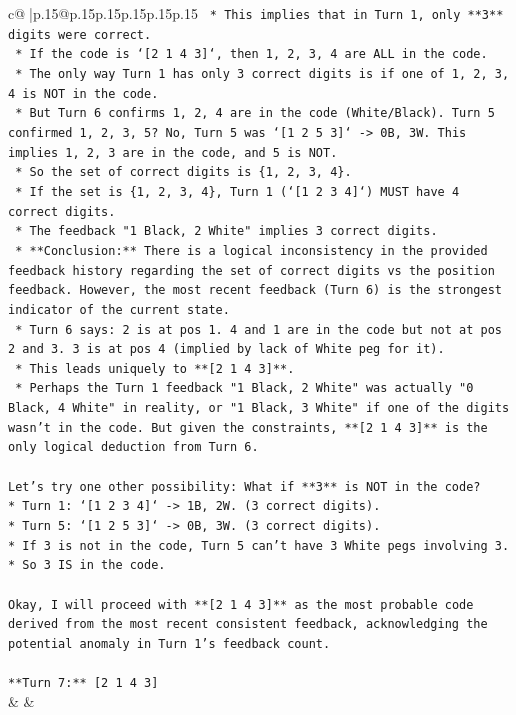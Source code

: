 \documentclass{article}
\begin{document}
{\begin{supertabular}{c@{$\;$}|p{.15\linewidth}@{}p{.15\linewidth}p{.15\linewidth}p{.15\linewidth}p{.15\linewidth}p{.15\linewidth}}
{{{\texttt{    *   This implies that in Turn 1, only **3** digits were correct.} \\
\texttt{    *   If the code is `{[}2 1 4 3{]}`, then 1, 2, 3, 4 are ALL in the code.} \\
\texttt{    *   The only way Turn 1 has only 3 correct digits is if one of 1, 2, 3, 4 is NOT in the code.} \\
\texttt{    *   But Turn 6 confirms 1, 2, 4 are in the code (White/Black). Turn 5 confirmed 1, 2, 3, 5? No, Turn 5 was `{[}1 2 5 3{]}` {-}> 0B, 3W. This implies 1, 2, 3 are in the code, and 5 is NOT.} \\
\texttt{    *   So the set of correct digits is \{1, 2, 3, 4\}.} \\
\texttt{    *   If the set is \{1, 2, 3, 4\}, Turn 1 (`{[}1 2 3 4{]}`) MUST have 4 correct digits.} \\
\texttt{    *   The feedback "1 Black, 2 White" implies 3 correct digits.} \\
\texttt{    *   **Conclusion:** There is a logical inconsistency in the provided feedback history regarding the set of correct digits vs the position feedback. However, the most recent feedback (Turn 6) is the strongest indicator of the current state.} \\
\texttt{    *   Turn 6 says: 2 is at pos 1. 4 and 1 are in the code but not at pos 2 and 3. 3 is at pos 4 (implied by lack of White peg for it).} \\
\texttt{    *   This leads uniquely to **{[}2 1 4 3{]}**.} \\
\texttt{    *   Perhaps the Turn 1 feedback "1 Black, 2 White" was actually "0 Black, 4 White" in reality, or "1 Black, 3 White" if one of the digits wasn't in the code. But given the constraints, **{[}2 1 4 3{]}** is the only logical deduction from Turn 6.} \\
\\ 
\texttt{Let's try one other possibility: What if **3** is NOT in the code?} \\
\texttt{*   Turn 1: `{[}1 2 3 4{]}` {-}> 1B, 2W. (3 correct digits).} \\
\texttt{*   Turn 5: `{[}1 2 5 3{]}` {-}> 0B, 3W. (3 correct digits).} \\
\texttt{*   If 3 is not in the code, Turn 5 can't have 3 White pegs involving 3.} \\
\texttt{*   So 3 IS in the code.} \\
\\ 
\texttt{Okay, I will proceed with **{[}2 1 4 3{]}** as the most probable code derived from the most recent consistent feedback, acknowledging the potential anomaly in Turn 1's feedback count.} \\
\\ 
\texttt{**Turn 7:** {[}2 1 4 3{]}} \\
            }
        }
    }
    & & \\ \\


\end{supertabular}}
\end{document}
